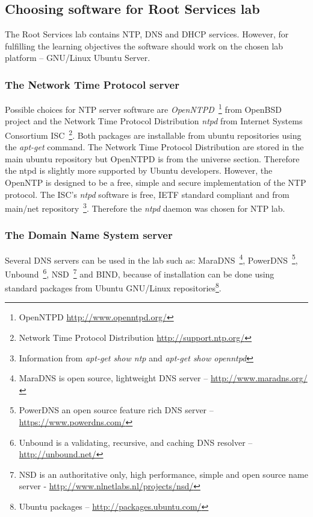 \subsection{Choosing software for Root Services lab}
The Root Services lab contains \gls{NTP}, \gls{DNS} and \gls{DHCP} services. However, for fulfilling the learning objectives the software should work on the chosen lab platform -- GNU/Linux Ubuntu Server. 

\subsubsection{The Network Time Protocol server}
Possible choices for \gls{NTP} server software are \emph{OpenNTPD}~\footnote{OpenNTPD \url{http://www.openntpd.org/}
} from OpenBSD  project and the Network Time Protocol Distribution \emph{ntpd} from  Internet Systems Consortium \gls{ISC}~\footnote{Network Time Protocol Distribution \url{http://support.ntp.org/}}. Both packages are installable from ubuntu repositories using the \emph{apt-get} command. The Network Time Protocol Distribution are stored in the main ubuntu repository but OpenNTPD is from the universe section. Therefore the \gls{ntpd} is  slightly more supported by Ubuntu developers.
However, the OpenNTP is designed to be a free, simple and secure implementation of the \gls{NTP} protocol. The \gls{ISC}'s \emph{ntpd} software is free, \gls{IETF} standard compliant and from main/net repository~\footnote{Information from \emph{apt-get show ntp} and \emph{apt-get show openntpd}}. Therefore the \emph{ntpd} daemon was chosen for \gls{NTP} lab.
\subsubsection{The Domain Name System server}
Several \gls{DNS} servers can be used in the lab such as: MaraDNS~\footnote{ MaraDNS is open source, lightweight \gls{DNS} server -- \url{http://www.maradns.org/}}, PowerDNS~\footnote{PowerDNS an open source feature rich \gls{DNS} server -- \url{https://www.powerdns.com/}}, Unbound~\footnote{Unbound is a validating, recursive, and caching \gls{DNS} resolver -- \url{http://unbound.net/}}, NSD~\footnote{NSD is an authoritative only, high performance, simple and open source name server - \url{http://www.nlnetlabs.nl/projects/nsd/}} and \gls{BIND}, because of installation can be done using standard packages from Ubuntu GNU/Linux repositories\footnote{Ubuntu packages --  \url{http://packages.ubuntu.com/}}.

